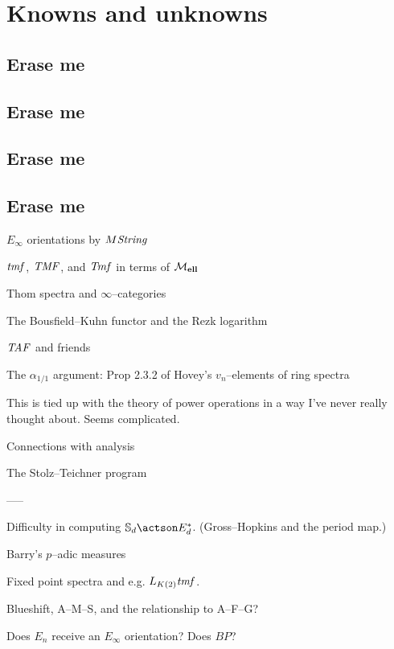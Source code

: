 
\chapter{Knowns and unknowns}

\section{Erase me}

\section{Erase me}

\section{Erase me}

\section{Erase me}


$E_\infty$ orientations by $M\mathit{String}$

$\mathit{tmf}$, $\mathit{TMF}$, and $\mathit{Tmf}$ in terms of $\mathcal{M}_{\mathbf{ell}}$

Thom spectra and $\infty$--categories

The Bousfield--Kuhn functor and the Rezk logarithm



$\mathit{TAF}$ and friends

The $\alpha_{1/1}$ argument: Prop 2.3.2 of Hovey's $v_n$--elements of ring spectra



This is tied up with the theory of power operations in a way I've never really thought about.  Seems complicated.


Connections with analysis

The Stolz--Teichner program







-----

Difficulty in computing $\S_d \actson E_d^*$. (Gross--Hopkins and the period map.)

Barry's $p$--adic measures

Fixed point spectra and e.g. $L_{K(2)} \mathit{tmf}$.

Blueshift, A--M--S, and the relationship to A--F--G?

Does $E_n$ receive an $E_\infty$ orientation?  Does $BP$?

